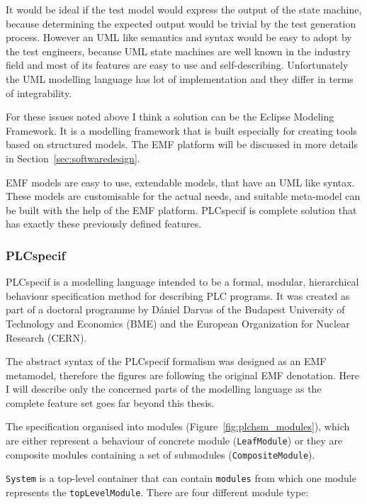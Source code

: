 It would be ideal if the test model would express the output of the state machine, because determining the expected output would be trivial by the test generation process. However an UML like semantics and syntax would be easy to adopt by the test engineers, because UML state machines are well known in the industry field and most of its features are easy to use and self-describing. Unfortunately the UML modelling language has lot of implementation and they differ in terms of integrability.

For these issues noted above I think a solution can be the Eclipse Modeling Framework. It is a modelling framework that is built especially for creating tools based on structured models. The EMF platform will be discussed in more details in Section~\ref{sec:softwaredesign}.

EMF models are easy to use, extendable models, that have an UML like syntax.  These models are customisable for the actual needs, and suitable meta-model can be built with the help of the EMF platform. PLCspecif is complete solution that has exactly these previously defined features.

\subsubsection{PLCspecif}
\label{ssub:plcspecif}

PLCspecif \cite{plcspecif} is a modelling language intended to be a formal, modular, hierarchical behaviour specification method for describing PLC programs. It was created as part of a doctoral programme by Dániel Darvas of the Budapest University of Technology and Economics (BME) and the European Organization for Nuclear Research (CERN).

The abstract syntax of the PLCspecif formalism was designed as an EMF metamodel, therefore the figures are following the original EMF denotation. Here I will describe only the concerned parts of the modelling language as the complete feature set goes far beyond this thesis.

The specification organised into modules (Figure~\ref{fig:plchsm_modules}), which are either represent a behaviour of concrete module (\texttt{LeafModule}) or they are composite modules containing a set of submodules (\texttt{CompositeModule}).

\texttt{System} is a top-level container that can contain \texttt{modules} from which one module represents the \texttt{topLevelModule}. There are four different module type:

